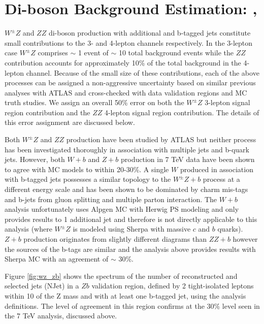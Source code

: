 \section{Di-boson Background Estimation: \WZ,\ZZ }

$W^{\pm}Z$ and $ZZ$ di-boson production with additional and b-tagged jets constitute small contributions to 
the 3- and 4-lepton channels respectively. In the 3-lepton case $W^{\pm}Z$ comprises $\sim$ 1 event of $\sim$ 10 
total background events while the $ZZ$ contribution accounts for approximately 10\% of the total background in the 
4-lepton channel. Because of the small size of these contributions, each of the above processes can be assigned a 
non-aggressive uncertainty based on similar previous analyses with ATLAS and cross-checked with data validation 
regions and MC truth studies. We assign an overall 50\% error on both the $W^{\pm}Z$ 3-lepton signal region 
contribution and the $ZZ$ 4-lepton signal region contribution. The details of this error assignment are discussed below.
 
Both $W^{\pm}Z$ and $ZZ$ production have been studied by ATLAS \cite{WZAtlas}\cite{ZZAtlas} but neither process
has been investigated thoroughly in association with multiple jets and b-quark jets. However, both $W+b$ \cite{WbAtlas} 
and $Z+b$ \cite{ZbAtlas} production in 7 TeV data have been shown to agree with MC models to within 20-30\%. 
A single $W$ produced in association with b-tagged jets possesses a similar topology to the $W^{\pm}Z+b$ 
process at a different energy scale and has been shown to be dominated by charm mis-tags and b-jets from gluon splitting 
and multiple parton interaction. The $W+b$ analysis unfortunately uses Alpgen MC with Herwig PS modeling and only provides
results to 1 additional jet and therefore is not directly applicable to this \tth analysis (where $W^{\pm}Z$ is modeled 
using Sherpa with massive $c$ and $b$ quarks). $Z+b$ production originates from slightly different diagrams than $ZZ+b$ 
however the sources of the b-tags are similar and the analysis above provides results with Sherpa MC with an agreement 
of $\sim$ 30\%.
 
Figure \ref{fig:wz_zb} shows the spectrum of the number of reconstructed and selected jets (NJet) in a 
$Zb$ validation region, defined by 2 tight-isolated leptons within 10 \gevcc of the Z mass and with at 
least one b-tagged jet, using the \tth analysis definitions. The level of agreement in this region confirms 
at the  30\% level seen in the 7 TeV analysis, discussed above. 

